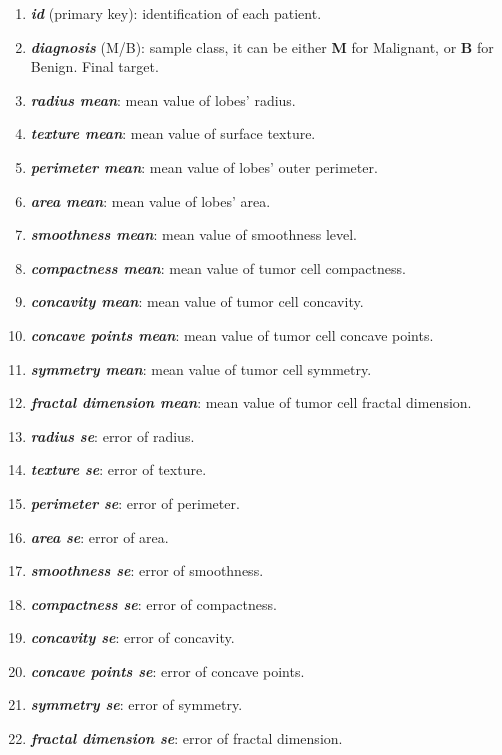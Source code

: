 \documentclass[conference]{IEEEtran}
\begin{document}
\begin{enumerate}
     \item \textbf{\textit{id}} (primary key): identification of each patient.
     \item \textbf{\textit{diagnosis}} (M/B): sample class, it can be either \textbf{M} for Malignant, 
     or \textbf{B} for Benign. Final target.
     
     \item \textbf{\textit{radius mean}}: mean value of lobes' radius.
     \item \textbf{\textit{texture mean}}: mean value of surface texture.
     \item \textbf{\textit{perimeter mean}}: mean value of lobes' outer perimeter.
     \item \textbf{\textit{area mean}}: mean value of lobes' area.
     \item \textbf{\textit{smoothness mean}}: mean value of smoothness level.
     
     \item \textbf{\textit{compactness mean}}: mean value of tumor cell compactness.
     \item \textbf{\textit{concavity mean}}: mean value of tumor cell concavity.
     \item \textbf{\textit{concave points mean}}: mean value of tumor cell concave points.
     \item \textbf{\textit{symmetry mean}}: mean value of tumor cell symmetry.
     \item \textbf{\textit{fractal dimension mean}}: mean value of tumor cell fractal dimension.
     
     \item \textbf{\textit{radius se}}: error of radius.
     \item \textbf{\textit{texture se}}: error of texture.
     \item \textbf{\textit{perimeter se}}: error of perimeter.
     \item \textbf{\textit{area se}}: error of area.
     \item \textbf{\textit{smoothness se}}: error of smoothness.
     \item \textbf{\textit{compactness se}}: error of compactness.
     
     \item \textbf{\textit{concavity se}}: error of concavity.
     \item \textbf{\textit{concave points se}}: error of concave points.
     \item \textbf{\textit{symmetry se}}: error of symmetry.
     \item \textbf{\textit{fractal dimension se}}: error of fractal dimension.
     

\end{enumerate}
\end{document}
